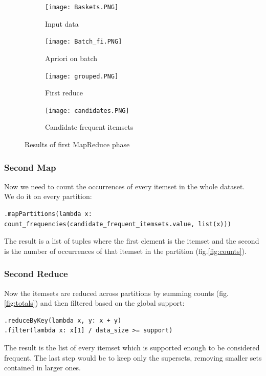 \documentclass[a4paper]{article}
\begin{document}
	\begin{figure}[h]
		\centering
		
		\begin{subfigure}[b]{0.24\textwidth}
			\centering
			\texttt{[image: Baskets.PNG]}
         	\caption{Input data}
         	\label{fig:input_data}
		\end{subfigure}
		\hfill
		\begin{subfigure}[b]{0.24\textwidth}
			\centering
			\texttt{[image: Batch\_fi.PNG]}
         	\caption{Apriori on batch}
         	\label{fig:apriori}
		\end{subfigure}
		\hfill
		\begin{subfigure}[b]{0.24\textwidth}
			\centering
			\texttt{[image: grouped.PNG]}
         	\caption{First reduce}
         	\label{fig:grouped}
		\end{subfigure}
		\hfill
		\begin{subfigure}[b]{0.24\textwidth}
			\centering
			\texttt{[image: candidates.PNG]}
         	\caption{Candidate frequent itemsets}
         	\label{fig:candidate_fi}
		\end{subfigure}
	\caption{Results of first MapReduce phase}
	\end{figure}
	
	\subsubsection{Second Map}
	Now we need to count the occurrences of every itemset in the whole dataset.\\
	We do it on every partition:
	\begin{lstlisting}
.mapPartitions(lambda x: count_frequencies(candidate_frequent_itemsets.value, list(x)))
\end{lstlisting}
	The result is a list of tuples where the first element is the itemset and the second is the number of occurrences of that itemset in the partition (fig.\ref{fig:counts}).
	
	\subsubsection{Second Reduce}
	Now the itemsets are reduced across partitions by summing counts (fig.\ref{fig:totals}) and then filtered based on the global support:
	\begin{lstlisting}
.reduceByKey(lambda x, y: x + y)
.filter(lambda x: x[1] / data_size >= support)
\end{lstlisting}
	The result is the list of every itemset which is supported enough to be considered frequent. The last step would be to keep only the supersets, removing smaller sets contained in larger ones.
	
\end{document}
